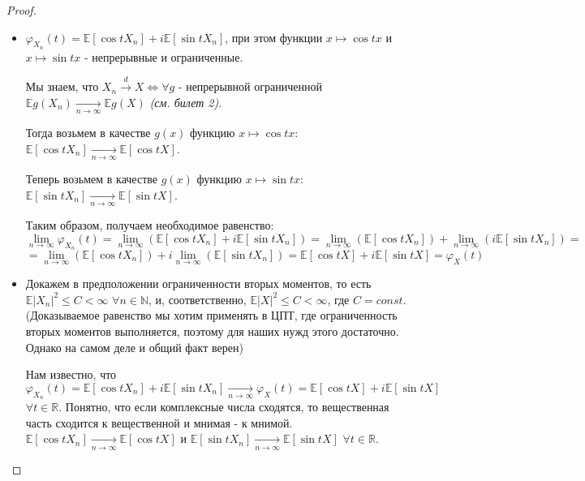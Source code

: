 \begin{proof}
    \text{}
    \renewcommand{\labelitemi}{$\boldsymbol{\Rightarrow}$}
    \begin{itemize}
        \item \text{}
        
        $\varphi_{X_n}(t) = \mathbb{E}[\cos{tX_n}] + i\mathbb{E}[\sin{tX_n}]$, при этом функции $x \mapsto \cos{tx}$ и $x \mapsto \sin{tx}$ - непрерывные и ограниченные.
        
        Мы знаем, что $X_n \xrightarrow{d} X \Leftrightarrow \forall g$ - непрерывной ограниченной $\mathbb{E}g(X_n) \xrightarrow[n \rightarrow \infty]{} \mathbb{E}g(X)$ \textit{(см. билет 2)}.
        
        Тогда возьмем в качестве $g(x)$ функцию $x \mapsto \cos{tx}$: $\mathbb{E}[\cos{tX_n}] \xrightarrow[n \rightarrow \infty]{} \mathbb{E}[\cos{tX}]$.
        
        Теперь возьмем в качестве $g(x)$ функцию $x \mapsto \sin{tx}$: $\mathbb{E}[\sin{tX_n}] \xrightarrow[n \rightarrow \infty]{} \mathbb{E}[\sin{tX}]$.
        
        Таким образом, получаем необходимое равенство:
        $$\lim_{n \to \infty} \varphi_{X_n}(t) = \lim_{n \to \infty} (\mathbb{E}[\cos{tX_n}] + i\mathbb{E}[\sin{tX_n}]) = \lim_{n \to \infty} (\mathbb{E}[\cos{tX_n}]) + \lim_{n \to \infty} (i\mathbb{E}[\sin{tX_n}]) =$$
        $$= \lim_{n \to \infty} (\mathbb{E}[\cos{tX_n}]) + i\lim_{n \to \infty} (\mathbb{E}[\sin{tX_n}]) = \mathbb{E}[\cos{tX}] + i\mathbb{E}[\sin{tX}] = \varphi_{X}(t)$$
    \end{itemize}
    
    \renewcommand{\labelitemi}{$\boldsymbol{\Leftarrow}$}
    \begin{itemize}
        \item \text{}
        
        Докажем в предположении ограниченности вторых моментов, то есть $\mathbb{E}|X_n|^2 \leq C < \infty$ $\forall n \in \mathbb{N}$, и, соответственно, $\mathbb{E}|X|^2 \leq C < \infty$, где $C = const$. (Доказываемое равенство мы хотим применять в ЦПТ, где ограниченность вторых моментов выполняется, поэтому для наших нужд этого достаточно. Однако на самом деле и общий факт верен)
        
        Нам известно, что $\varphi_{X_n}(t) = \mathbb{E}[\cos{tX_n}] + i\mathbb{E}[\sin{tX_n}] \xrightarrow[n \rightarrow \infty]{} \varphi_{X}(t) = \mathbb{E}[\cos{tX}] + i\mathbb{E}[\sin{tX}]$ $\forall t \in \mathbb{R}$. Понятно, что если комплексные числа сходятся, то вещественная часть сходится к вещественной и мнимая - к мнимой. $\mathbb{E}[\cos{tX_n}] \xrightarrow[n \rightarrow \infty]{} \mathbb{E}[\cos{tX}]$ и $ \mathbb{E}[\sin{tX_n}] \xrightarrow[n \rightarrow \infty]{} \mathbb{E}[\sin{tX}]$ $\forall t \in \mathbb{R}$.
        

\end{itemize}
\end{proof}
